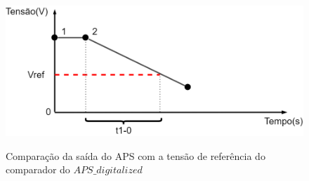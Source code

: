 \begin{figure}[!h]
 \centering
    \centering
    \caption{\label{figurataps}Comparação da saída do APS com a tensão de referência do comparador do $APS\_digitalized$ \NomeBloco} 
    \includegraphics[scale=0.3]{Imagens/Graficot.png}
    \label{\NomePFig}
\end{figure}
